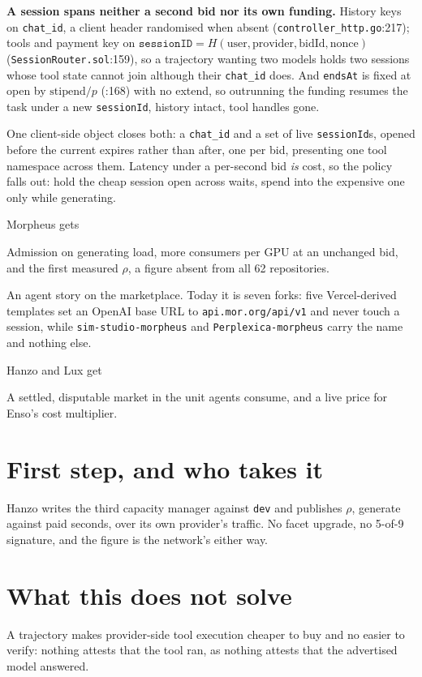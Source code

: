 \documentclass[10pt,a4paper]{article}
\begin{document}
\textbf{A session spans neither a second bid nor its own funding.} History keys on
\texttt{chat\_id}, a client header randomised when absent (\texttt{controller\_http.go}:217); tools
and payment key on $\texttt{sessionID}=H(\text{user},\text{provider},\text{bidId},\text{nonce})$
(\texttt{SessionRouter.sol}:159), so a trajectory wanting two models holds two sessions whose tool
state cannot join although their \texttt{chat\_id} does. And \texttt{endsAt} is fixed at open by
$\text{stipend}/p$ (:168) with no extend, so outrunning the funding resumes the task under a new
\texttt{sessionId}, history intact, tool handles gone.

One client-side object closes both: a \texttt{chat\_id} and a set of live \texttt{sessionId}s,
opened before the current expires rather than after, one per bid, presenting one tool namespace
across them. Latency under a per-second bid \emph{is} cost, so the policy falls out: hold the cheap
session open across waits, spend into the expensive one only while generating.

\begin{stake}{Morpheus gets}
\item Admission on generating load, more consumers per GPU at an unchanged bid, and the first
      measured $\rho$, a figure absent from all 62 repositories.
\item An agent story on the marketplace. Today it is seven forks: five Vercel-derived templates set
      an OpenAI base URL to \texttt{api.mor.org/api/v1} and never touch a session, while
      \texttt{sim-studio-morpheus} and \texttt{Perplexica-morpheus} carry the name and nothing
      else.
\end{stake}

\begin{stake}{Hanzo and Lux get}
\item A settled, disputable market in the unit agents consume, and a live price for Enso's cost
      multiplier.
\end{stake}

\section*{First step, and who takes it}

Hanzo writes the third capacity manager against \texttt{dev} and publishes $\rho$, generate against
paid seconds, over its own provider's traffic. No facet upgrade, no 5-of-9 signature, and the
figure is the network's either way.

\section*{What this does not solve}

A trajectory makes provider-side tool execution cheaper to buy and no easier to verify: nothing
attests that the tool ran, as nothing attests that the advertised model answered.

\vspace{0.5ex}
\end{document}
